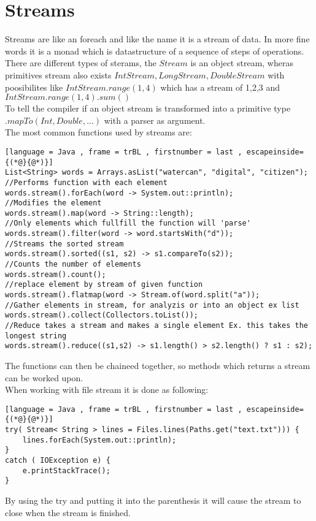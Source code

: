 \documentclass[12pt, a4paper]{article}
\begin{document}
	\section{Streams}
		Streams are like an foreach and like the name it is a stream of data. In more fine words it is a monad which is datastructure of a sequence of steps of operations.\\
		There are different types of sterams, the $Stream$ is an object stream, wheras primitives stream also exists $IntStream, LongStream, DoubleStream$ with poosibilites like $IntStream.range(1,4)$ which has a stream of 1,2,3 and \\$IntStream.range(1,4).sum()$\\
		To tell the compiler if an object stream is transformed into a primitive type $.mapTo(Int,Double,...)$ with a parser as argument.\\
		The most common functions used by streams are:
\begin{lstlisting}[language = Java , frame = trBL , firstnumber = last , escapeinside={(*@}{@*)}]
List<String> words = Arrays.asList("watercan", "digital", "citizen");
//Performs function with each element
words.stream().forEach(word -> System.out::println);
//Modifies the element
words.stream().map(word -> String::length);
//Only elements which fullfill the function will 'parse'
words.stream().filter(word -> word.startsWith("d"));
//Streams the sorted stream
words.stream().sorted((s1, s2) -> s1.compareTo(s2)); 
//Counts the number of elements
words.stream().count();
//replace element by stream of given function
words.stream().flatmap(word -> Stream.of(word.split("a")); 
//Gather elements in stream, for analyzis or into an object ex list
words.stream().collect(Collectors.toList());
//Reduce takes a stream and makes a single element Ex. this takes the longest string
words.stream().reduce((s1,s2) -> s1.length() > s2.length() ? s1 : s2);
\end{lstlisting}
		The functions can then be chaineed together, so methods which returns a stream can be worked upon.\\
		When working with file stream it is done as following:
\begin{lstlisting}[language = Java , frame = trBL , firstnumber = last , escapeinside={(*@}{@*)}]
try( Stream< String > lines = Files.lines(Paths.get("text.txt"))) {
	lines.forEach(System.out::println);
}
catch ( IOException e) {
	e.printStackTrace();
}
\end{lstlisting}
		By using the try and putting it into the parenthesis it will cause the stream to close when the stream is finished.\\
\end{document}
